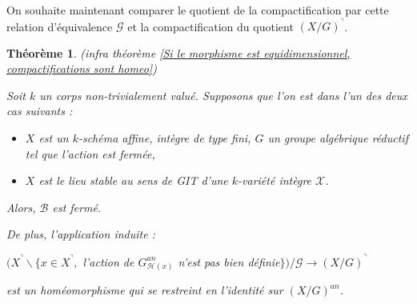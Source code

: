 \documentclass[11pt]{article}
\newtheorem{thm}{Théorème}[section]
\newtheorem{prop}[thm]{Proposition}
\begin{document}
On souhaite maintenant comparer le quotient de la compactification par cette relation d'équivalence $\mathcal{G}$ et la compactification du quotient $(X/G)^\urcorner$.

%
%

\begin{thm}(infra théorème \ref{Si le morphisme est equidimensionnel, compactifications sont homeo})

Soit $k$ un corps non-trivialement valué. Supposons que l'on est dans l'un des deux cas suivants :
\begin{itemize}
\item $X$ est un $k$-schéma affine, intègre de type fini, $G$ un groupe algébrique réductif tel que l'action est fermée,
\item $X$ est le lieu stable au sens de GIT d'une $k$-variété intègre $\mathcal{X}$.
\end{itemize} 
Alors, $\mathcal{B}$ est fermé. 

De plus, l'application induite :
\begin{center}
$(X^\urcorner \backslash \lbrace x\in X^\urcorner,$ l'action de $G^{an}_{\mathcal{H}(x)}$ n'est pas bien définie$\rbrace)/\mathcal{G} \rightarrow (X/G)^\urcorner$
\end{center}
est un homéomorphisme qui se restreint en l'identité sur $(X/G)^{an}$.
\end{thm}
\end{document}
